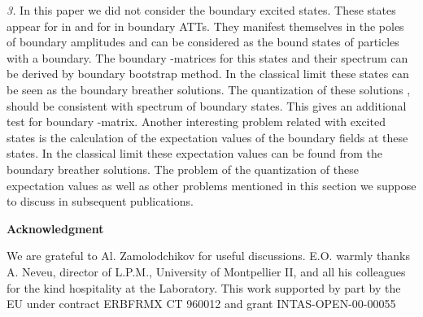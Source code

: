 \documentclass[a4paper,12pt,titlepage,final]{article}
\begin{document}
\textit{3.\/} In this paper we did not consider the boundary excited states. These
states appear for \coordHE{} in \coordHE{} and for
\coordHE{} in \coordHE{} boundary ATTs.
They manifest themselves in
the poles of boundary amplitudes \coordHE{} and can be considered as
the bound states of particles with a boundary. The boundary \coordHE{}-matrices
for this states and their spectrum can be derived by boundary bootstrap
method. In the classical limit these states can be seen as the boundary
breather solutions. The quantization of these solutions \cite{CT},\cite{CDE}
should be consistent with spectrum of boundary states. This gives an
additional test for boundary \coordHE{}-matrix. Another interesting problem related
with excited states is the calculation of the expectation values of the
boundary fields at these states. In the classical limit these expectation
values can be found from the boundary breather solutions. The problem of the
quantization of these expectation values as well as other problems mentioned
in this section we suppose to discuss in subsequent publications.

\bigskip
\begin{center}
\textbf{Acknowledgment}
\end{center}
We are grateful to Al. Zamolodchikov for useful
discussions.  E.O. warmly thanks A. Neveu, director of L.P.M.,
University of Montpellier II, and all his colleagues for the kind
hospitality at the Laboratory.  This work supported by part by the EU
under contract ERBFRMX CT 960012 and grant INTAS-OPEN-00-00055
\end{document}
